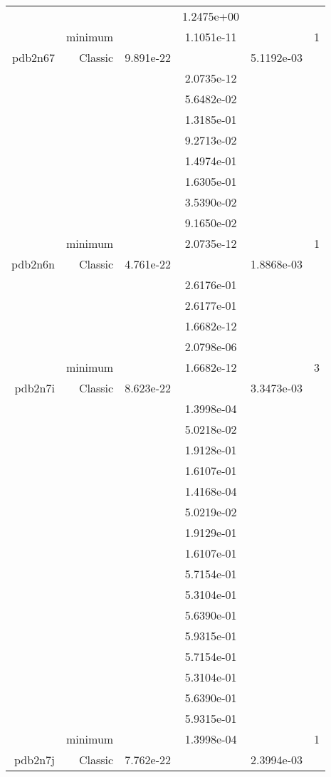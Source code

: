 \begin{xltabular}{\textwidth}{r|rS[table-format=1.3e+2]S[table-format=1.4e+2]S[table-format=1.4e+2]S[table-format=-1.5]}
&  &  & 1.2475e+00 & & \\
& minimum &  & 1.1051e-11 & & 1 \\  \addlinespace
pdb2n67 & Classic & 9.891e-22 &  & 5.1192e-03 & \\
&  &  & 2.0735e-12 & & \\
&  &  & 5.6482e-02 & & \\
&  &  & 1.3185e-01 & & \\
&  &  & 9.2713e-02 & & \\
&  &  & 1.4974e-01 & & \\
&  &  & 1.6305e-01 & & \\
&  &  & 3.5390e-02 & & \\
&  &  & 9.1650e-02 & & \\
& minimum &  & 2.0735e-12 & & 1 \\  \addlinespace
pdb2n6n & Classic & 4.761e-22 &  & 1.8868e-03 & \\
&  &  & 2.6176e-01 & & \\
&  &  & 2.6177e-01 & & \\
&  &  & 1.6682e-12 & & \\
&  &  & 2.0798e-06 & & \\
& minimum &  & 1.6682e-12 & & 3 \\  \addlinespace
pdb2n7i & Classic & 8.623e-22 &  & 3.3473e-03 & \\
&  &  & 1.3998e-04 & & \\
&  &  & 5.0218e-02 & & \\
&  &  & 1.9128e-01 & & \\
&  &  & 1.6107e-01 & & \\
&  &  & 1.4168e-04 & & \\
&  &  & 5.0219e-02 & & \\
&  &  & 1.9129e-01 & & \\
&  &  & 1.6107e-01 & & \\
&  &  & 5.7154e-01 & & \\
&  &  & 5.3104e-01 & & \\
&  &  & 5.6390e-01 & & \\
&  &  & 5.9315e-01 & & \\
&  &  & 5.7154e-01 & & \\
&  &  & 5.3104e-01 & & \\
&  &  & 5.6390e-01 & & \\
&  &  & 5.9315e-01 & & \\
& minimum &  & 1.3998e-04 & & 1 \\  \addlinespace
pdb2n7j & Classic & 7.762e-22 &  & 2.3994e-03 & \\

\end{xltabular}
